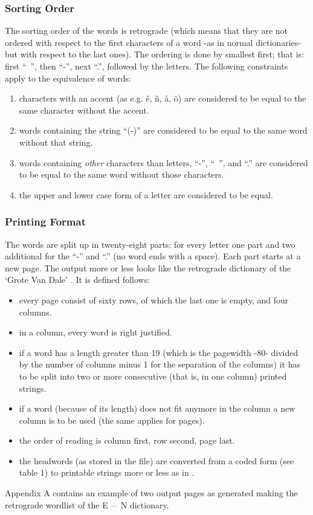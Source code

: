 \subsubsection{Sorting Order}
 The sorting order of the words is retrograde (which 
 means that they are not ordered with respect to the first characters of a 
 word -as in normal dictionaries- but with respect to the last ones). 
 The ordering is done by smallest first; that is: first ``~'', then 
  ``-'', next ``.'', followed by the letters.
 The following constraints apply to the equivalence of words:
 \begin{enumerate}
  \item characters with an accent (as e.g. \^{e}, \~{n}, \aa, \"{o}) are 
  considered to be equal to the same character without the accent.
  \item words containing the string ``(-)'' are considered to be equal to the 
  same word without that string.
  \item words containing {\em other} characters than letters, ``-'', ``~'', and 
  ``.'' are considered to be equal to the same word without those characters.
  \item the upper and lower case form of a letter are considered to be equal.
 \end {enumerate}
\subsubsection{Printing Format}
 The words are split up in twenty-eight parts: for every letter one part and 
 two additional for the ``-'' and ``.'' (no word ends with a space). Each part 
 starts at a new page. The output more or less looks like the retrograde 
 dictionary of the `Grote Van Dale' \cite{ni:retro}. It is defined follows:
  \begin{itemize}
   \item every page consist of sixty rows, of which the last one is empty, and
         four columns.
   \item in a column, every word is right justified.
   \item if a word has a length greater than 19 (which is the pagewidth -80-
         divided by the number of columns minus 1 for the separation of the 
         columns) it has to be split into two or more consecutive (that is, in 
         one column) printed strings.
   \item if a word (because of its length) does not fit anymore in the column
         a new column is to be used (the same applies for pages).
   \item the order of reading is column first, row second, page last.
   \item the headwords (as stored in the file) are converted from a coded form 
         (see table 1) to printable strings more or less as in \cite{st:groot}.
  \end{itemize}
Appendix A contains an example of two output pages as generated making the 
retrograde wordlist of the E~--~N dictionary.
